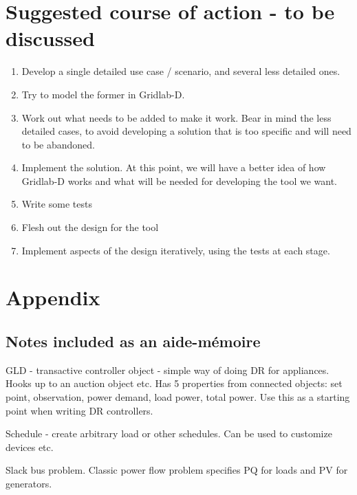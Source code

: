 \documentclass[12pt]{article}
\begin{document}
\section{Suggested course of action - to be discussed}
\begin{enumerate}
\item Develop a single detailed use case / scenario, and several less detailed ones.
\item Try to model the former in Gridlab-D.
\item Work out what needs to be added to make it work. Bear in mind the less detailed cases, to avoid developing a
solution that is too specific and will need to be abandoned.
\item Implement the solution. At this point, we will have a better idea of how Gridlab-D works and what will be needed
for developing the tool we want.
\item Write some tests
\item Flesh out the design for the tool
\item Implement aspects of the design iteratively, using the tests at each
stage. 
\end{enumerate}

\section{Appendix}
\subsection{Notes included as an aide-m\'emoire}
GLD - transactive controller object - simple way of doing DR for appliances.  Hooks up to an auction object etc. Has 5 properties from connected objects: set point, observation, power demand, load power, total power. Use this as a starting point when writing DR controllers. 

Schedule - create arbitrary load or other schedules. Can be used to customize devices etc.

Slack bus problem. Classic power flow problem specifies PQ for loads and PV for generators.
\end{document}
